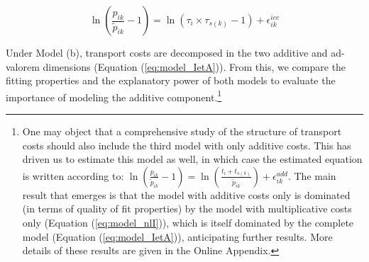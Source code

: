 \documentclass[a4paper,11pt]{article}
\begin{document}
\begin{equation}
\ln\left(\frac{p_{ik}}{\widetilde{p}_{ik}}-1 \right)= \ln \left(\tau_{i}\times\tau_{s(k)}-1 \right) + \epsilon^{ice}_{ik} \label{eq:model_nlI}
\end{equation}

Under Model (b), transport costs are decomposed in the two additive and ad-valorem dimensions (Equation (\ref{eq:model_IetA})).
From this, we compare the fitting properties and the explanatory power of both models to evaluate the importance of modeling the additive component.\footnote{One may object that a comprehensive study of the structure of transport costs should also include the third model with only additive costs.
This has driven us to estimate this model as well, in which case the estimated equation is written according to: $\ln\left(\frac{p_{ik}}{\widetilde{p}_{ik}}-1 \right)= \ln \left(\frac{t_{i} + t_{s(k)}}{\widetilde{p}_{ik}}\right) + \epsilon^{add}_{ik}$.
The main result that emerges is that the model with additive costs only is dominated (in terms of quality of fit properties) by the model with multiplicative costs only (Equation (\ref{eq:model_nlI})), which is itself dominated by the complete model (Equation (\ref{eq:model_IetA})), anticipating further results.
More details of these results are given in the Online Appendix.}



\end{document}
